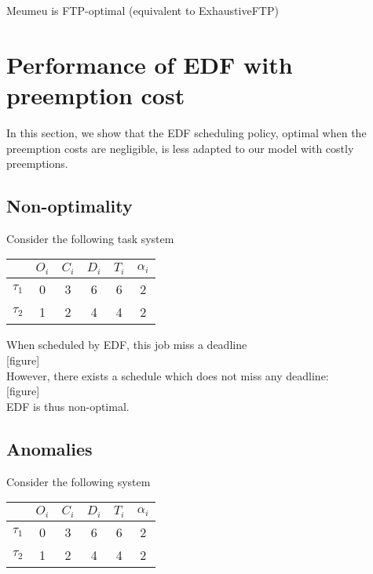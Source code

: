 \documentclass[a4paper,10pt]{article}
\begin{document}
        Meumeu is FTP-optimal (equivalent to ExhaustiveFTP)

\section{Performance of EDF with preemption cost}

    In this section, we show that the EDF scheduling policy, optimal when the preemption costs are negligible, is less adapted to our model with costly preemptions.

    \subsection{Non-optimality}

        Consider the following task system

        \begin{center}
            \begin{tabular}{|r|c|c|c|c|c|}
                \hline
                            & $O_i$ & $C_i$ & $D_i$ & $T_i$ & $\alpha_i$ \\ \hline
                $\tau_1$    & 0     & 3     & 6    & 6     & 2     \\ \hline
                $\tau_2$    & 1     & 2     & 4    & 4     & 2     \\ \hline
            \end{tabular}
        \end{center}

        When scheduled by EDF, this job miss a deadline\\

        [figure]\\

        However, there exists a schedule which does not miss any deadline:\\

        [figure]\\

        EDF is thus non-optimal.

    \subsection{Anomalies}

        Consider the following system

        \begin{center}
            \begin{tabular}{|r|c|c|c|c|c|}
                \hline
                            & $O_i$ & $C_i$ & $D_i$ & $T_i$ & $\alpha_i$ \\ \hline
                $\tau_1$    & 0     & 3     & 6    & 6     & 2     \\ \hline
                $\tau_2$    & 1     & 2     & 4    & 4     & 2     \\ \hline
            \end{tabular}
        \end{center}
\end{document}
